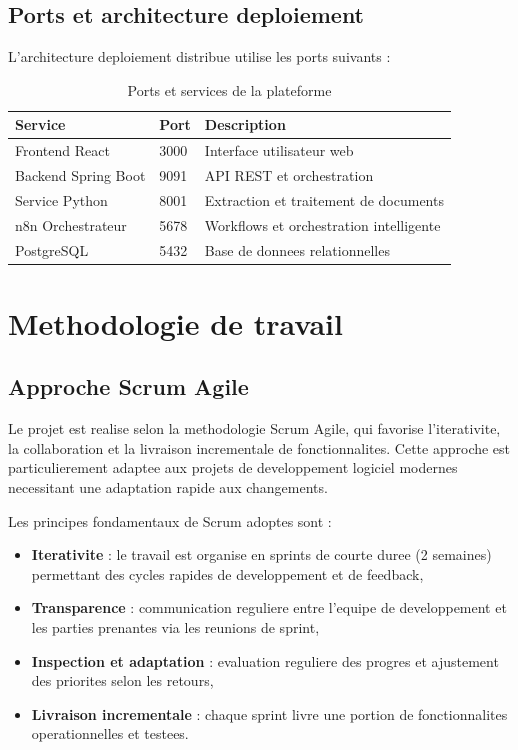 \subsection{Ports et architecture deploiement}

L'architecture deploiement distribue utilise les ports suivants :

\begin{table}[!ht]
\centering
\begin{tabular}{p{5cm}p{2cm}p{4cm}}
\toprule
\textbf{Service} & \textbf{Port} & \textbf{Description} \\
\midrule
Frontend React & 3000 & Interface utilisateur web \\
Backend Spring Boot & 9091 & API REST et orchestration \\
Service Python & 8001 & Extraction et traitement de documents \\
n8n Orchestrateur & 5678 & Workflows et orchestration intelligente \\
PostgreSQL & 5432 & Base de donnees relationnelles \\
\bottomrule
\end{tabular}
\caption{Ports et services de la plateforme}
\label{tab:ports-services}
\end{table}

\section{Methodologie de travail}

\subsection{Approche Scrum Agile}

Le projet est realise selon la methodologie Scrum Agile, qui favorise l'iterativite, la collaboration et la livraison incrementale de fonctionnalites. Cette approche est particulierement adaptee aux projets de developpement logiciel modernes necessitant une adaptation rapide aux changements.

Les principes fondamentaux de Scrum adoptes sont :

\begin{itemize}
    \item \textbf{Iterativite} : le travail est organise en sprints de courte duree (2 semaines) permettant des cycles rapides de developpement et de feedback,
    
    \item \textbf{Transparence} : communication reguliere entre l'equipe de developpement et les parties prenantes via les reunions de sprint,
    
    \item \textbf{Inspection et adaptation} : evaluation reguliere des progres et ajustement des priorites selon les retours,
    
    \item \textbf{Livraison incrementale} : chaque sprint livre une portion de fonctionnalites operationnelles et testees.
\end{itemize}

